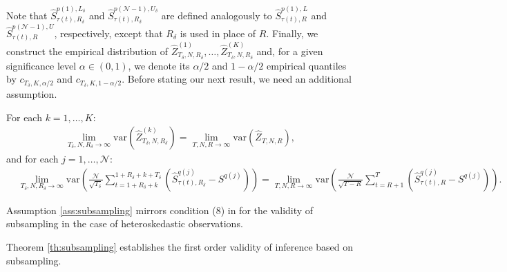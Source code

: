 \noindent
Note that $\widehat{S}_{\tau(t) ,R_\delta}^{p(1), L_\delta}$ and $\widehat{S}_{\tau(t), R_\delta}^{p(\mathcal{N}-1), U_\delta}$ are defined analogously to $\widehat{S}_{\tau(t) ,R}^{p(1), L}$ and $\widehat{S}_{\tau(t), R}^{p(\mathcal{N}-1), U}$, respectively, except that $R_\delta$ is used in place of $R$. Finally, we construct the empirical distribution of $\widehat{Z}_{T_\delta,N,R_\delta}^{(1)},\ldots,\widehat{Z}_{T_\delta,N,R_\delta}^{(K)}$ and, for a given significance level $\alpha\in(0,1)$, we denote its $\alpha/2$ and $1-\alpha/2$ empirical quantiles by $c_{T_\delta,K,\alpha/2}$ and $c_{T_\delta,K,1-\alpha/2}$. Before stating our next result, we need an additional assumption.
\begin{assumption}
\label{ass:subsampling} 
For each $k=1,\ldots,K$: 
\begin{align*}
    \lim_{T_\delta,N,R_\delta\rightarrow \infty }\mathrm{var}\left(\widehat{Z}_{T_\delta,N,R_\delta}^{(k)}\right)= \lim_{T,N,R\rightarrow \infty }\mathrm{var} \left(\widehat{Z}_{T,N,R}\right),
\end{align*}
and for each $j=1,\ldots,\mathcal{N}$:
\begin{align*}
&\lim_{T_\delta,N,R_\delta\rightarrow \infty }\mathrm{var}\left( \frac{\mathcal{N}}{\sqrt{T_\delta}} \sum_{t=1+R_\delta+k}^{1+R_\delta+k+T_\delta}\left( \widehat{S}_{\tau(t) ,R_\delta}^{q(j)}-S^{q(j)}\right) \right) = \lim_{T,N,R\rightarrow \infty }\mathrm{var}\left( \frac{\mathcal{N}}{\sqrt{T-R}} \sum_{t=R+1}^{T}\left( \widehat{S}_{\tau(t),R}^{q(j)}-S^{q(j)}\right) \right). 
\end{align*}
\end{assumption}

\noindent
Assumption \ref{ass:subsampling} mirrors condition (8) in \cite{politis1997subsampling} for the validity of subsampling in the case of heteroskedastic observations.

Theorem \ref{th:subsampling} establishes the first order validity of inference based on subsampling.

